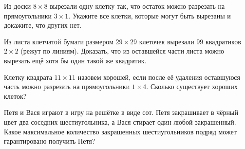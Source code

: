 \begin{problem}
	Из доски $8 \times 8$ вырезали одну клетку так, что остаток можно разрезать на прямоугольники $3 \times 1$. Укажите все клетки, которые могут быть вырезаны и докажите, что других нет.
\end{problem}

\begin{problem}
	Из листа клетчатой бумаги размером $29 \times 29$ клеточек вырезали $99$ квадратиков $2 \times 2$ (режут по линиям). Доказать, что из оставшейся части листа можно вырезать ещё хотя бы один такой же квадратик.
\end{problem}

\begin{problem}
	Клетку квадрата $11 \times 11$ назовем хорошей, если после её удаления оставшуюся часть можно разрезать на прямоугольники $1 \times 4$. Сколько существует хороших клеток?
\end{problem}

\begin{problem}
	Петя и Вася играют в игру на решётке в виде сот. Петя закрашивает в чёрный цвет два соседних шестиугольника, а Вася стирает один любой закрашенный. Какое максимальное количество закрашенных шестиугольников подряд может гарантировано получить Петя?
\end{problem}

